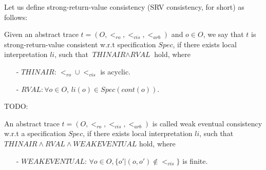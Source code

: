 Let us define strong-return-value consistency (SRV consistency, for short) as follows:

\begin{definition}
\label{definition:strong return value consistency}
Given an abstract trace $t = (O,<_{\textit{ro}},<_{\textit{vis}},<_{\textit{arb}})$ and $o \in O$, we say that $t$ is strong-return-value consistent w.r.t specification $Spec$, if there exists local interpretation $li$, such that $\textit{THINAIR} \wedge \textit{RVAL}$ hold, where

\begin{itemize}
\setlength{\itemsep}{0.5pt}
\item[-] $\textit{THINAIR}$: $<_{\textit{ro}} \cup <_{\textit{vis}}$ is acyclic.

\item[-] $\textit{RVAL}: \forall o \in O$, $li(o) \in Spec(cont(o))$.
\end{itemize}
\end{definition}


{\color {blue}TODO:

\begin{definition}
\label{definition:eventual consistency}
An abstract trace $t = (O,<_{\textit{ro}},<_{\textit{vis}},<_{\textit{arb}})$ is called weak eventual consistency w.r.t a specification $Spec$, if there exists local interpretation $li$, such that $\textit{THINAIR} \wedge \textit{RVAL} \wedge \textit{WEAKEVENTUAL}$ hold, where

\begin{itemize}
\setlength{\itemsep}{0.5pt}
\item[-] $\textit{WEAKEVENTUAL}$: $\forall o \in O, \{ o' \vert (o,o') \notin <_{\textit{vis}} \}$ is finite.
\end{itemize}
\end{definition}

}














